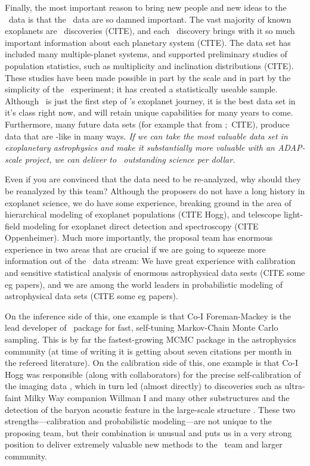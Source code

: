 \documentclass[letterpaper,12pt,preprint]{hack_aastex}
\newcommand{\emcee}{\package{emcee}}
\begin{document}
Finally, the most important reason to bring new people and new ideas
to the \Kepler\ data is that the \Kepler\ data are so damned
important.  The vast majority of known exoplanets are
\Kepler\ discoveries (CITE), and each \Kepler\ discovery brings with
it so much important information about each planetary system (CITE).
The data set has included many multiple-planet systems, and supported
preliminary studies of population statistics, such as multiplicity and
inclination distributions (CITE).  These studies have been made
possible in part by the scale and in part by the simplicity of the
\Kepler\ experiment; it has created a statistically useable sample.
Although \Kepler\ is just the first step of \NASA's exoplanet journey,
it is the best data set in it's class right now, and will retain
unique capabilities for many years to come.  Furthermore, many future
data sets (for example that from \TESS;\ CITE), produce data that are
\Kepler-like in many ways.  \emph{If we can take the most valuable
  data set in exoplanetary astrophysics and make it substantially more
  valuable with an ADAP-scale project, we can deliver to
  \NASA\ outstanding science per dollar.}

Even if you are convinced that the data need to be re-analyzed, why
should they be reanalyzed by this team?  Although the proposers do not
have a long history in exoplanet science, we do have some experience,
breaking ground in the area of hierarchical modeling of exoplanet
populations (CITE Hogg), and telescope light-field modeling for
exoplanet direct detection and spectroscopy (CITE Oppenheimer).  Much
more importantly, the proposal team has enormous experience in two
areas that are crucial if we are going to squeeze more information out
of the \Kepler\ data stream: We have great experience with calibration
and sensitive statistical analysis of enormous astrophysical data
sests (CITE some eg papers), and we are among the world leaders in
probabilistic modeling of astrophysical data sets (CITE some eg
papers).

On the inference side of this,
one example is that Co-I Foreman-Mackey is the lead developer of \emcee\
package \citep{emcee} for fast, self-tuning Markov-Chain Monte Carlo sampling.
This is by far the fastest-growing MCMC package in the astrophysics community
 (at time of writing it is getting about seven citations per month in the
refereed literature).
On the calibration side of this,
one example is that Co-I Hogg was responsible (along with collaborators) for
the precise self-calibration of the \observatory{Sloan Digital Sky Survey}
imaging data \citep{ubercal}, which in turn led (almost directly)
to discoveries such as ultra-faint Milky Way companion Willman I
 \citep{wil1} and many other substructures \citep[for example,][]{wil2, field, gd1} and the detection of the baryon acoustic feature
in the large-scale structure \citep{bao}.  These two
strengths---calibration and probabilistic modeling---are not unique to
the proposing team, but their combination is unusual and puts us in a
very strong position to deliver extremely valuable new methods to the
\Kepler\ team and larger community.
\end{document}
